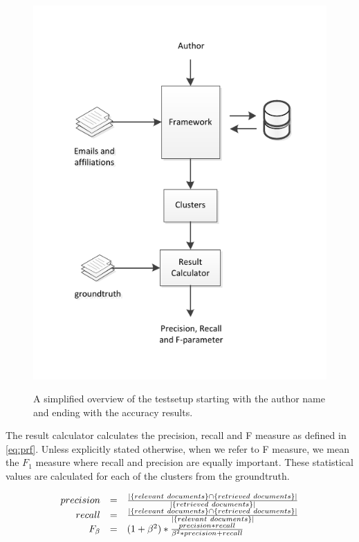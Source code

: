 \begin{figure}[htb]
	\centering
		\includegraphics{./fig/testsetup.pdf}
	\label{fig:testsetup}
	\caption{A simplified overview of the testsetup starting with the author name and ending with the accuracy results.}
\end{figure}

The result calculator calculates the precision, recall and F measure as defined in \autoref{eq:prf}. Unless explicitly stated otherwise, when we refer to F measure, we mean the $F_{1}$ measure where recall and precision are equally important. These statistical values are calculated for each of the clusters from the groundtruth. 

\begin{equation}
	\label{eq:prf}
	\begin{array}{r c l}
		precision & = & \frac{\left|\left\{relevant~documents\right\} \cap \left\{retrieved~documents\right\}\right|}{\left|\left\{retrieved~documents\right\}\right|} \\
		recall & = & \frac{\left|\left\{relevant~documents\right\} \cap \left\{retrieved~documents\right\}\right|}{\left|\left\{relevant~documents\right\}\right|} \\
		F_{\beta} & = & ( 1 + \beta^{2} ) * \frac{precision * recall}{\beta^{2} * precision + recall} \\
	\end{array}
\end{equation}

